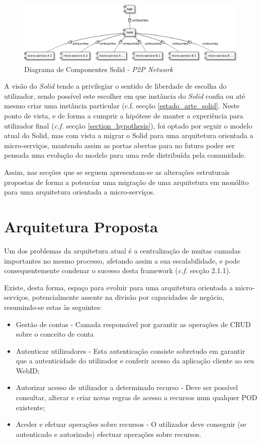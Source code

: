 \begin{figure}[H]
    \begin{center}
    \includegraphics[width=1 \textwidth]{figures/solid_web2.eps}
    \caption{Diagrama de Componentes Solid - \emph{P2P Network}}
    \label{figure_solid_p2p_network}
    \end{center}
\end{figure}

A visão do \emph{Solid} tende a privilegiar o sentido de liberdade de escolha do utilizador, sendo possível este escolher em que instância do \emph{Solid} confia ou até mesmo criar uma instância particular ({c.f. secção \ref{estado_arte_solid}}. Neste ponto de vista, e 
de forma a cumprir a hipótese de manter a experiência para utilizador final (\emph{c.f.} secção \ref{section_hypothesis}), foi optado por seguir o modelo atual do Solid, mas com vista a migrar o Solid para uma arquitetura orientada a micro-serviços, mantendo assim as portas abertas para no futuro poder ser pensada uma evolução do modelo para uma rede distribuída pela comunidade.

Assim, nas secções que se seguem apresentam-se as alterações estruturais propostas de forma a potenciar uma migração de uma arquitetura em monólito para uma arquitetura orientada a micro-serviços.

\section{Arquitetura Proposta \label{section_arquitetura_proposta}}
Um dos problemas da arquitetura atual é a centralização de muitas camadas importantes no mesmo processo, afetando assim a sua escalabilidade, e pode consequentemente condenar o sucesso desta framework (\emph{c.f.} secção 2.1.1).

Existe, desta forma, espaço para evoluir para uma arquitetura orientada a micro-serviços, potencialmente assente na divisão por capacidades de negócio, resumindo-se estas às seguintes:
\begin{itemize}
    \item Gestão de contas - Camada responsável por garantir as operações de CRUD sobre o conceito de conta
    \item  Autenticar utilizadores - Esta autenticação consiste sobretudo em garantir que a autenticidade do utilizador e conferir acesso da aplicação cliente ao seu WebID;
    \item Autorizar acesso de utilizador a determinado recurso - Deve ser possível consultar, alterar e criar novas regras de acesso a recursos num qualquer POD existente;
    \item Aceder e efetuar operações sobre recursos - O utilizador deve conseguir (se autenticado e autorizado) efectuar operações sobre recursos.
\end{itemize}

